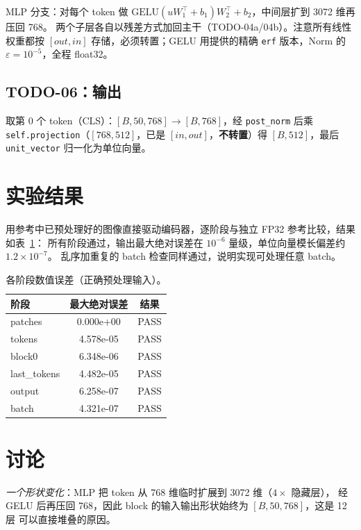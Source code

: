 \documentclass[a4paper,12pt]{article}
\begin{document}
MLP 分支：对每个 token 做
$\mathrm{GELU}(uW_1^{\top}+b_1)W_2^{\top}+b_2$，中间层扩到 3072 维再压回 768。
两个子层各自以残差方式加回主干（TODO-04a/04b）。注意所有线性权重都按
$[out,in]$ 存储，必须转置；GELU 用提供的精确 \texttt{erf} 版本，Norm 的
$\varepsilon=10^{-5}$，全程 float32。

\subsection{TODO-06：输出}

取第 0 个 token（CLS）：$[B,50,768]\rightarrow[B,768]$，经 \texttt{post\_norm}
后乘 \texttt{self.projection}（$[768,512]$，已是 $[in,out]$，\textbf{不转置}）得
$[B,512]$，最后 \texttt{unit\_vector} 归一化为单位向量。

\section{实验结果}

用参考中已预处理好的图像直接驱动编码器，逐阶段与独立 FP32 参考比较，结果如表~\ref{tab:err}：
所有阶段通过，输出最大绝对误差在 $10^{-6}$ 量级，单位向量模长偏差约 $1.2\times10^{-7}$。
乱序加重复的 batch 检查同样通过，说明实现可处理任意 batch。

\begin{table}[H]
\centering
\caption{各阶段数值误差（正确预处理输入）。}
\label{tab:err}
\begin{tabular}{l c c}
\hline
阶段 & 最大绝对误差 & 结果 \\
\hline
patches     & 0.000e+00 & PASS \\
tokens      & 4.578e-05 & PASS \\
block0      & 6.348e-06 & PASS \\
last\_tokens& 4.482e-05 & PASS \\
output      & 6.258e-07 & PASS \\
batch       & 4.321e-07 & PASS \\
\hline
\end{tabular}
\end{table}

\section{讨论}

\emph{一个形状变化}：MLP 把 token 从 768 维临时扩展到 3072 维（$4\times$ 隐藏层），
经 GELU 后再压回 768，因此 block 的输入输出形状始终为 $[B,50,768]$，这是 12 层
可以直接堆叠的原因。
\end{document}
